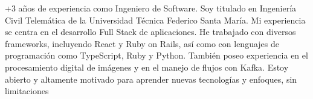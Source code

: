 

\begin{cvparagraph}
  +3 años de experiencia como Ingeniero de Software. Soy titulado en Ingeniería Civil Telemática de la 
  Universidad Técnica Federico Santa María. Mi experiencia se centra en el desarrollo Full Stack de aplicaciones. 
  He trabajado con diversos frameworks, incluyendo React y Ruby on Rails, así como con lenguajes de programación 
  como TypeScript, Ruby y Python. También poseo experiencia en el procesamiento digital de imágenes y en el manejo 
  de flujos con Kafka. Estoy abierto y altamente motivado para aprender nuevas tecnologías y enfoques, sin limitaciones
\end{cvparagraph}
